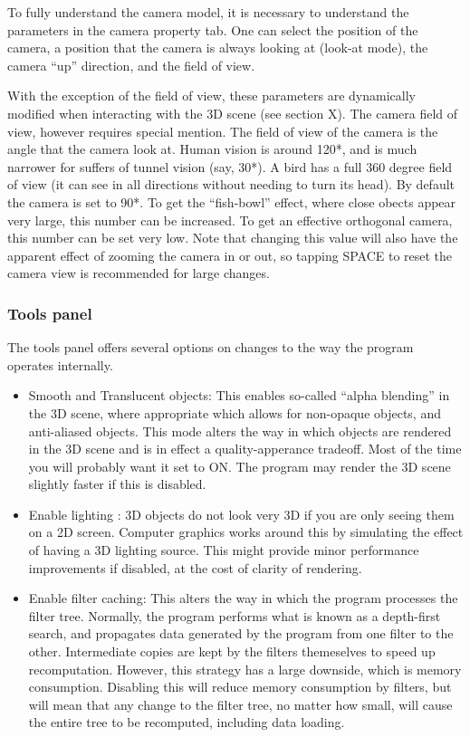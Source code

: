 \documentclass[10pt]{article}
\begin{document}
{ To fully understand the camera model, it is necessary to understand the parameters in the camera property tab. One can select the position of the camera, a position that the camera is always looking at (look-at mode), the camera ``up'' direction, and the field of view.  

 With the exception of the field of view, these parameters are dynamically modified when interacting with the 3D scene (see section X). The camera field of view, however requires special mention. The field of view of the camera is the angle that the camera look at. Human vision is around 120*, and is much narrower for suffers of tunnel vision (say, 30*). A bird has a full 360 degree field of view (it can see in all directions without needing to turn its head). By default the camera is set to 90*. To get the ``fish-bowl'' effect, where close obects appear very large, this number can be increased. To get an effective orthogonal camera, this number can be set very low. Note that changing this value will also have the apparent effect of zooming the camera in or out, so tapping SPACE to reset the camera view is recommended for large changes. 
\subsubsection{Tools panel}


  The tools panel offers several options on changes to the way the program operates internally. \begin{itemize}
\item  Smooth and Translucent objects: This enables so-called ``alpha blending'' in the 3D scene, where appropriate which allows for non-opaque objects, and anti-aliased objects. This mode alters the way in which objects are rendered in the 3D scene and is in effect a quality-apperance tradeoff. Most of the time you will probably want it set to ON. The program may render the 3D scene slightly faster if this is disabled.
 
\item  Enable lighting : 3D objects do not look very 3D if you are only seeing them on a 2D screen. Computer graphics works around this by simulating the effect of having a 3D lighting source. This might provide minor performance improvements if disabled, at the cost of clarity of rendering.
 
\item Enable filter caching: This alters the way in which the program processes the filter tree. Normally, the program performs what is known as a depth-first search, and propagates data generated by the program from one filter to the other. Intermediate copies are kept by the filters themeselves to speed up recomputation. However, this strategy has a large downside, which is memory consumption. Disabling this will reduce memory consumption by filters, but will mean that any change to the filter tree, no matter how small, will cause the entire tree to be recomputed, including data loading.


\end{itemize}}
\end{document}
